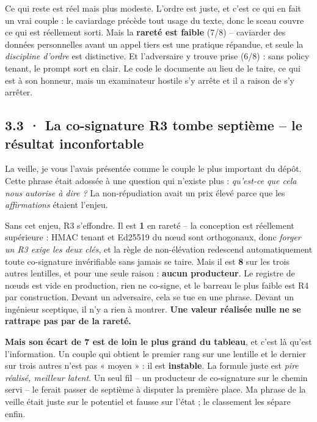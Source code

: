 \documentclass[10pt]{article}
\newcommand{\best}[1]{{\color{green}\textbf{#1}}}
\newcommand{\pire}[1]{{\color{red}\textbf{#1}}}
\newcommand{\sz}[1]{{\small\color{grey}\textsf{#1}}}
\begin{document}
Ce qui reste est réel mais plus modeste. L'ordre est juste, et c'est ce qui en fait un vrai couple :
le caviardage précède tout usage du texte, donc le sceau couvre ce qui est réellement sorti. Mais la
\textbf{rareté est faible} (\sz{7/8}) -- caviarder des données personnelles avant un appel tiers est
une pratique répandue, et seule la \emph{discipline d'ordre} est distinctive. Et l'adversaire y trouve
prise (\sz{6/8}) : sans policy tenant, le prompt sort en clair. Le code le documente au lieu de le
taire, ce qui est à son honneur, mais un examinateur hostile s'y arrête et il a raison de s'y arrêter.

\subsection{3.3 · La co-signature R3 tombe septième -- le résultat inconfortable}

La veille, je vous l'avais présentée comme le couple le plus important du dépôt. Cette phrase était
adossée à une question qui n'existe plus : \emph{qu'est-ce que cela nous autorise à dire ?} La
non-répudiation avait un prix élevé parce que les \emph{affirmations} étaient l'enjeu.

Sans cet enjeu, R3 s'effondre. Il est \best{1} en rareté -- la conception est réellement supérieure :
HMAC tenant et Ed25519 du n\oe ud sont orthogonaux, donc \emph{forger un R3 exige les deux clés}, et la
règle de non-élévation redescend automatiquement toute co-signature invérifiable sans jamais se taire.
Mais il est \pire{8} sur les trois autres lentilles, et pour une seule raison : \textbf{aucun
producteur}. Le registre de n\oe uds est vide en production, rien ne co-signe, et le barreau le plus
faible est R4 par construction. Devant un adversaire, cela se tue en une phrase. Devant un ingénieur
sceptique, il n'y a rien à montrer. \textbf{Une valeur réalisée nulle ne se rattrape pas par de la
rareté.}

\begin{piste}
\textbf{Mais son écart de \pire{7} est de loin le plus grand du tableau}, et c'est là qu'est
l'information. Un couple qui obtient le premier rang sur une lentille et le dernier sur trois autres
n'est pas « moyen » : il est \textbf{instable}. La formule juste est \emph{pire réalisé, meilleur
latent}. Un seul fil -- un producteur de co-signature sur le chemin servi -- le ferait passer de
septième à disputer la première place. Ma phrase de la veille était juste sur le potentiel et fausse
sur l'état ; le classement les sépare enfin.
\end{piste}
\end{document}
